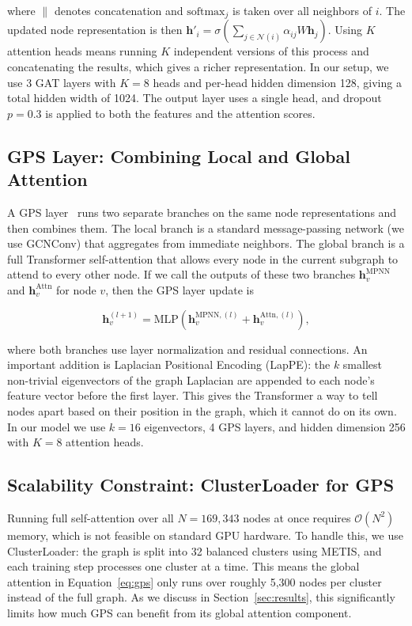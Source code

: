 \documentclass[conference]{IEEEtran}
\begin{document}
where $\|$ denotes concatenation and $\text{softmax}_j$ is taken over all neighbors of
$i$. The updated node representation is then $\mathbf{h}'_i = \sigma\!\left(\sum_{j \in
\mathcal{N}(i)} \alpha_{ij} W \mathbf{h}_j\right)$. Using $K$ attention heads means
running $K$ independent versions of this process and concatenating the results, which
gives a richer representation. In our setup, we use 3 GAT layers with $K=8$ heads and
per-head hidden dimension 128, giving a total hidden width of 1024. The output layer uses
a single head, and dropout $p=0.3$ is applied to both the features and the attention
scores.

\subsection{GPS Layer: Combining Local and Global Attention}

A GPS layer~\cite{rampasek2022} runs two separate branches on the same node representations
and then combines them. The local branch is a standard message-passing network (we use
GCNConv) that aggregates from immediate neighbors. The global branch is a full Transformer
self-attention that allows every node in the current subgraph to attend to every other
node. If we call the outputs of these two branches $\mathbf{h}_v^{\text{MPNN}}$ and
$\mathbf{h}_v^{\text{Attn}}$ for node $v$, then the GPS layer update is

\begin{equation}
\mathbf{h}_v^{(l+1)} = \text{MLP}\!\left(\mathbf{h}_v^{\text{MPNN},(l)} +
\mathbf{h}_v^{\text{Attn},(l)}\right),
\label{eq:gps}
\end{equation}

where both branches use layer normalization and residual connections. An important addition
is Laplacian Positional Encoding (LapPE): the $k$ smallest non-trivial eigenvectors of
the graph Laplacian are appended to each node's feature vector before the first layer.
This gives the Transformer a way to tell nodes apart based on their position in the graph,
which it cannot do on its own. In our model we use $k=16$ eigenvectors, 4 GPS layers, and
hidden dimension 256 with $K=8$ attention heads.

\subsection{Scalability Constraint: ClusterLoader for GPS}

Running full self-attention over all $N=169{,}343$ nodes at once requires $\mathcal{O}(N^2)$
memory, which is not feasible on standard GPU hardware. To handle this, we use ClusterLoader:
the graph is split into 32 balanced clusters using METIS, and each training step processes
one cluster at a time. This means the global attention in Equation~\eqref{eq:gps} only
runs over roughly 5,300 nodes per cluster instead of the full graph. As we discuss in
Section~\ref{sec:results}, this significantly limits how much GPS can benefit from its
global attention component.
\end{document}
